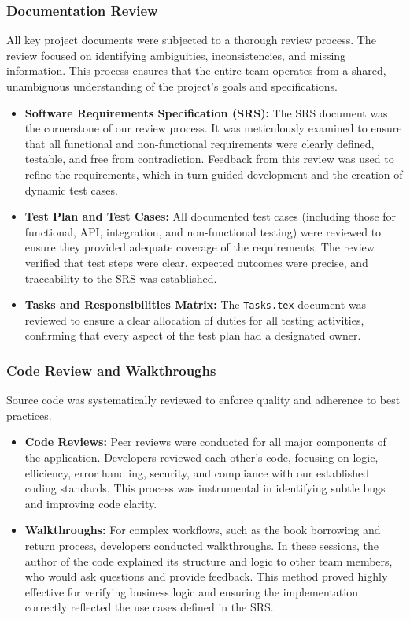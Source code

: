 \subsubsection{Documentation Review}
All key project documents were subjected to a thorough review process. The review focused on identifying ambiguities, inconsistencies, and missing information. This process ensures that the entire team operates from a shared, unambiguous understanding of the project's goals and specifications.

\begin{itemize}
    \item \textbf{Software Requirements Specification (SRS):} The SRS document was the cornerstone of our review process. It was meticulously examined to ensure that all functional and non-functional requirements were clearly defined, testable, and free from contradiction. Feedback from this review was used to refine the requirements, which in turn guided development and the creation of dynamic test cases.
    \item \textbf{Test Plan and Test Cases:} All documented test cases (including those for functional, API, integration, and non-functional testing) were reviewed to ensure they provided adequate coverage of the requirements. The review verified that test steps were clear, expected outcomes were precise, and traceability to the SRS was established.
    \item \textbf{Tasks and Responsibilities Matrix:} The \texttt{Tasks.tex} document was reviewed to ensure a clear allocation of duties for all testing activities, confirming that every aspect of the test plan had a designated owner.
\end{itemize}

\subsubsection{Code Review and Walkthroughs}
Source code was systematically reviewed to enforce quality and adherence to best practices.

\begin{itemize}
    \item \textbf{Code Reviews:} Peer reviews were conducted for all major components of the application. Developers reviewed each other's code, focusing on logic, efficiency, error handling, security, and compliance with our established coding standards. This process was instrumental in identifying subtle bugs and improving code clarity.
    \item \textbf{Walkthroughs:} For complex workflows, such as the book borrowing and return process, developers conducted walkthroughs. In these sessions, the author of the code explained its structure and logic to other team members, who would ask questions and provide feedback. This method proved highly effective for verifying business logic and ensuring the implementation correctly reflected the use cases defined in the SRS.
\end{itemize}

